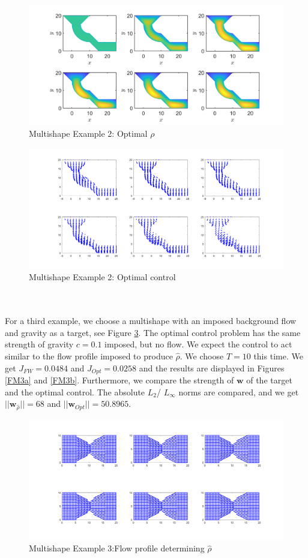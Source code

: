 \documentclass[11pt, a4paper]{article}
\theoremstyle{definition}
\newcommand{\w}{\mathbf{w}}
\newcommand{\hr}{\widehat \rho}
\begin{document}
\begin{figure}[h]
	\centering
	\includegraphics[scale=0.35]{MultiOpt2.png}
	\caption{Multishape Example 2: Optimal $\rho$} 
	\label{FM1a}
\end{figure}
\begin{figure}[h]
	\centering
	\includegraphics[scale=0.35]{MultiCont2.png}
	\caption{Multishape Example 2: Optimal control} 
	\label{FM2a}
\end{figure}
\\
\\
For a third example, we choose a multishape with an imposed background flow and gravity as a target, see Figure \ref{FM3}. The optimal control problem has the same strength of gravity $c = 0.1$ imposed, but no flow. We expect the control to act similar to the flow profile imposed to produce $\hr$. We choose $T = 10$ this time.
We get $J_{FW} = 0.0484$ and $J_{Opt} = 0.0258$ and the results are displayed in Figures \ref{FM3a} and \ref{FM3b}. Furthermore, we compare the strength of $\w$ of the target and the optimal control. The absolute $L_2$/ $L_\infty$ norms are compared, and we get $||\w_{\hr}|| = 68$ and $||\w_{Opt}|| = 50.8965$.
\begin{figure}[h]
	\centering
	\includegraphics[scale=0.35]{MultiwFW.png}
	\caption{Multishape Example 3:Flow profile determining $\hr$} 
	\label{FM3}
\end{figure}
\end{document}
